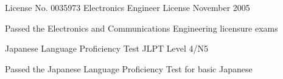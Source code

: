 

\begin{cventries}

  \cventry
    {License No. 0035973} %
    {Electronics Engineer License} %
    {} %
    {November 2005} %
    {
      \begin{cvitems} %
        \item {Passed the Electronics and Communications Engineering licensure exams}
      \end{cvitems}
    }

  \cventry
    {Japanese Language Proficiency Test} %
    {JLPT Level 4/N5} %
    {} %
    {} %
    {
      \begin{cvitems} %
        \item {Passed the Japanese Language Proficiency Test for basic Japanese}
      \end{cvitems}
    }


\end{cventries}
